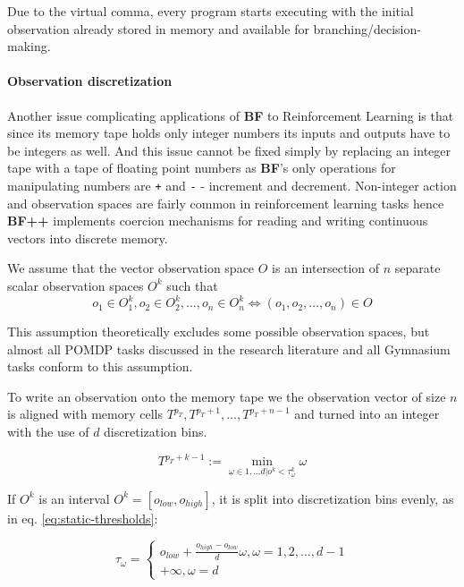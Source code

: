 Due to the virtual comma, every program starts executing with the initial observation already stored in memory and available for branching/decision-making.

\paragraph{Observation discretization}
\label{sec:observe}

Another issue complicating applications of \textbf{BF} to Reinforcement Learning is that since its memory tape holds only integer numbers its inputs and outputs have to be integers as well.
And this issue cannot be fixed simply by replacing an integer tape with a tape of floating point numbers as \textbf{BF}'s only operations for manipulating numbers are \texttt{+} and \texttt{-} - increment and decrement.
Non-integer action and observation spaces are fairly common in reinforcement learning tasks hence \textbf{BF++} implements coercion mechanisms for reading and writing continuous vectors into discrete memory.

We assume that the vector observation space $O$ is an intersection of $n$ separate scalar observation spaces $O^k$ such that 
\begin{equation}
 o_1 \in O_1^k,o_2 \in O_2^k,\dots,o_n \in O_n^k \Leftrightarrow (o_1,o_2,\dots,o_n) \in O  
\end{equation}

This assumption theoretically excludes some possible observation spaces, but almost all POMDP tasks discussed in the research literature and all Gymnasium tasks conform to this assumption.

To write an observation onto the memory tape we the observation vector of size $n$ is aligned with memory cells $T^{p_T},T^{p_T+1},\dots,T^{p_T+n-1}$ and turned into an integer with the use of $d$ discretization bins.

\begin{equation}
\label{eq:discretization}
T^{p_T+k-1} := \min_{\omega \in 1,\dots d | o^k < \tau^k_\omega} \omega
\end{equation}

If $O^k$ is an interval $O^k=[o_{low}, o_{high}]$, it is split into discretization bins evenly, as in eq. \ref{eq:static-thresholds}:

\begin{equation}
\label{eq:static-thresholds}
\tau_\omega = \begin{cases}
o_{low}+\frac{o_{high}-o_{low}}{d}\omega, \omega=1,2,\dots,d-1 \\
+\infty, \omega=d 
\end{cases}
\end{equation}

